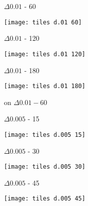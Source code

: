 \begin{enumerate}
\begin{multicols}{3}
\begin{center}
    $\Delta 0.01$ - 60

    \texttt{[image: tiles d.01 60]}

    $\Delta 0.01$ - 120

    \texttt{[image: tiles d.01 120]}

    $\Delta 0.01$ - 180

    \texttt{[image: tiles d.01 180]}
  \end{center}
  \end{multicols}

   on $\Delta 0.01 - 60$

  \begin{multicols}{3}
  \begin{center}

    $\Delta 0.005$ - 15

    \texttt{[image: tiles d.005 15]}

    $\Delta 0.005$ - 30

    \texttt{[image: tiles d.005 30]}

    $\Delta 0.005$ - 45

    \texttt{[image: tiles d.005 45]}
  \end{center}
  \end{multicols}
\end{enumerate}
